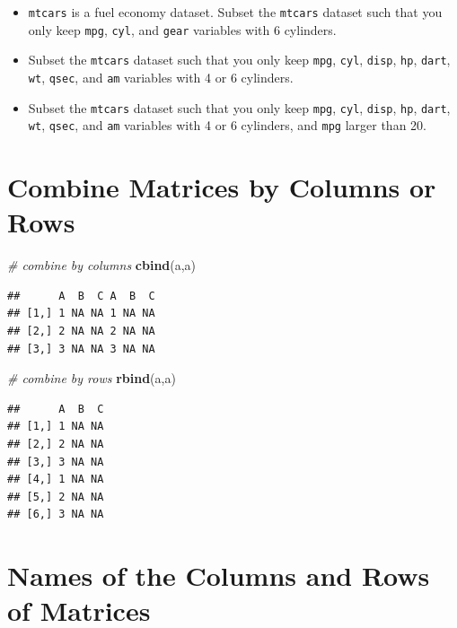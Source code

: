 \documentclass[]{book}
\newenvironment{Shaded}{\begin{snugshade}}{\end{snugshade}}
\newcommand{\KeywordTok}[1]{\textcolor[rgb]{0.13,0.29,0.53}{\textbf{{#1}}}}
\newcommand{\CommentTok}[1]{\textcolor[rgb]{0.56,0.35,0.01}{\textit{{#1}}}}
\newcommand{\NormalTok}[1]{{#1}}
\begin{document}
\begin{itemize}
\item
  \texttt{mtcars} is a fuel economy dataset. Subset the \texttt{mtcars}
  dataset such that you only keep \texttt{mpg}, \texttt{cyl}, and
  \texttt{gear} variables with 6 cylinders.
\item
  Subset the \texttt{mtcars} dataset such that you only keep
  \texttt{mpg}, \texttt{cyl}, \texttt{disp}, \texttt{hp}, \texttt{dart},
  \texttt{wt}, \texttt{qsec}, and \texttt{am} variables with 4 or 6
  cylinders.
\item
  Subset the \texttt{mtcars} dataset such that you only keep
  \texttt{mpg}, \texttt{cyl}, \texttt{disp}, \texttt{hp}, \texttt{dart},
  \texttt{wt}, \texttt{qsec}, and \texttt{am} variables with 4 or 6
  cylinders, and \texttt{mpg} larger than 20.
\end{itemize}

\section{Combine Matrices by Columns or
Rows}\label{combine-matrices-by-columns-or-rows}

\begin{Shaded}
\begin{Highlighting}[]
\CommentTok{# combine by columns}
\KeywordTok{cbind}\NormalTok{(a,a)   }
\end{Highlighting}
\end{Shaded}

\begin{verbatim}
##      A  B  C A  B  C
## [1,] 1 NA NA 1 NA NA
## [2,] 2 NA NA 2 NA NA
## [3,] 3 NA NA 3 NA NA
\end{verbatim}

\begin{Shaded}
\begin{Highlighting}[]
\CommentTok{# combine by rows}
\KeywordTok{rbind}\NormalTok{(a,a)   }
\end{Highlighting}
\end{Shaded}

\begin{verbatim}
##      A  B  C
## [1,] 1 NA NA
## [2,] 2 NA NA
## [3,] 3 NA NA
## [4,] 1 NA NA
## [5,] 2 NA NA
## [6,] 3 NA NA
\end{verbatim}

\section{Names of the Columns and Rows of
Matrices}\label{names-of-the-columns-and-rows-of-matrices}
\end{document}
